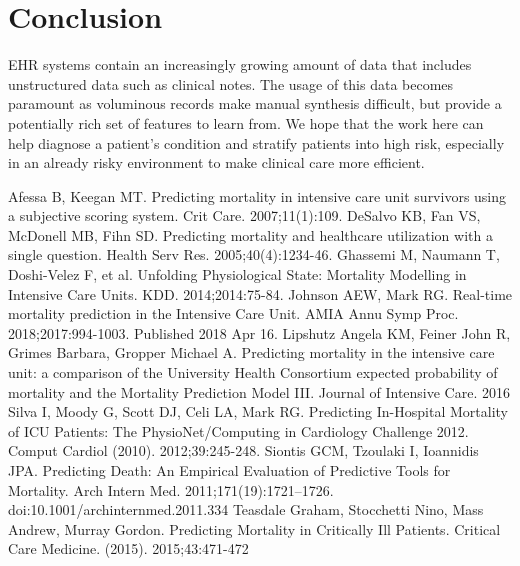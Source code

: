 \documentclass[12pt, final]{article}
\begin{document}
\section{Conclusion}
\label{Conclusion}
EHR systems contain an increasingly growing amount of data that includes unstructured data such as clinical notes. The usage of this data becomes paramount as voluminous records make manual synthesis difficult, but provide a potentially rich set of features to learn from. We hope that the work here can help diagnose a patient's condition and stratify patients into high risk, especially in an already risky environment to make clinical care more efficient.

  \begin{thebibliography}{1}
     Afessa B, Keegan MT. Predicting mortality in intensive care unit survivors using a subjective scoring system. Crit Care. 2007;11(1):109.   
     DeSalvo KB, Fan VS, McDonell MB, Fihn SD. Predicting mortality and healthcare utilization with a single question. Health Serv Res. 2005;40(4):1234-46. 
     Ghassemi M, Naumann T, Doshi-Velez F, et al. Unfolding Physiological State: Mortality Modelling in Intensive Care Units. KDD. 2014;2014:75-84.
     Johnson AEW, Mark RG. Real-time mortality prediction in the Intensive Care Unit. AMIA Annu Symp Proc. 2018;2017:994-1003. Published 2018 Apr 16.
     Lipshutz Angela KM, Feiner John R, Grimes Barbara, Gropper Michael A. Predicting mortality in the intensive care unit: a comparison of the University Health Consortium expected probability of mortality and the Mortality Prediction Model III. Journal of Intensive Care. 2016
     Silva I, Moody G, Scott DJ, Celi LA, Mark RG. Predicting In-Hospital Mortality of ICU Patients: The PhysioNet/Computing in Cardiology Challenge 2012. Comput Cardiol (2010). 2012;39:245-248.
	 Siontis GCM, Tzoulaki I, Ioannidis JPA. Predicting Death: An Empirical Evaluation of Predictive Tools for Mortality. Arch Intern Med. 2011;171(19):1721–1726. doi:10.1001/archinternmed.2011.334
	 Teasdale Graham, Stocchetti Nino, Mass Andrew, Murray Gordon. Predicting Mortality in Critically Ill Patients. Critical Care Medicine. (2015). 2015;43:471-472
  
  \end{thebibliography}
\end{document}
